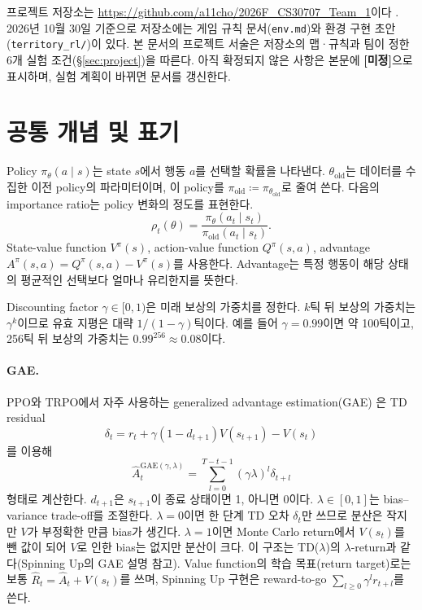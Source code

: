 \documentclass[11pt,a4paper]{article}
\newcommand{\TBD}{\textbf{[미정]}}
\begin{document}
프로젝트 저장소는 \url{https://github.com/a11cho/2026F_CS30707_Team_1}이다 \cite{repo}. 2026년 10월 30일 기준으로 저장소에는 게임 규칙 문서(\texttt{env.md})와 환경 구현 초안(\texttt{territory\_rl/})이 있다. 본 문서의 프로젝트 서술은 저장소의 맵·규칙과 팀이 정한 6개 실험 조건(\S\ref{sec:project})을 따른다. 아직 확정되지 않은 사항은 본문에 \TBD{}으로 표시하며, 실험 계획이 바뀌면 문서를 갱신한다.

\section{공통 개념 및 표기}\label{sec:common}
Policy \(\pi_\theta(a\mid s)\)는 state \(s\)에서 행동 \(a\)를 선택할 확률을 나타낸다. \(\theta_{\mathrm{old}}\)는 데이터를 수집한 이전 policy의 파라미터이며, 이 policy를 \(\pi_{\mathrm{old}}\coloneqq\pi_{\theta_{\mathrm{old}}}\)로 줄여 쓴다. 다음의 importance ratio는 policy 변화의 정도를 표현한다.
\begin{equation}
 \rho_t(\theta)=\frac{\pi_\theta(a_t\mid s_t)}{\pi_{\mathrm{old}}(a_t\mid s_t)}.
\end{equation}
State-value function \(V^\pi(s)\), action-value function \(Q^\pi(s,a)\), advantage \(A^\pi(s,a)=Q^\pi(s,a)-V^\pi(s)\)를 사용한다. Advantage는 특정 행동이 해당 상태의 평균적인 선택보다 얼마나 유리한지를 뜻한다.

Discounting factor \(\gamma\in[0,1)\)은 미래 보상의 가중치를 정한다. \(k\)틱 뒤 보상의 가중치는 \(\gamma^k\)이므로 유효 지평은 대략 \(1/(1-\gamma)\)틱이다. 예를 들어 \(\gamma=0.99\)이면 약 100틱이고, 256틱 뒤 보상의 가중치는 \(0.99^{256}\approx0.08\)이다.

\paragraph{GAE.} PPO와 TRPO에서 자주 사용하는 generalized advantage estimation(GAE) \cite{gae}은 TD residual
\begin{equation}
 \delta_t=r_t+\gamma(1-d_{t+1})V(s_{t+1})-V(s_t)
\end{equation}
를 이용해
\begin{equation}
 \widehat A_t^{\mathrm{GAE}(\gamma,\lambda)}=\sum_{l=0}^{T-t-1}(\gamma\lambda)^l\delta_{t+l}
\end{equation}
형태로 계산한다. \(d_{t+1}\)은 \(s_{t+1}\)이 종료 상태이면 1, 아니면 0이다. \(\lambda\in[0,1]\)는 bias--variance trade-off를 조절한다. \(\lambda=0\)이면 한 단계 TD 오차 \(\delta_t\)만 쓰므로 분산은 작지만 \(V\)가 부정확한 만큼 bias가 생긴다. \(\lambda=1\)이면 Monte Carlo return에서 \(V(s_t)\)를 뺀 값이 되어 \(V\)로 인한 bias는 없지만 분산이 크다. 이 구조는 TD(\(\lambda\))의 \(\lambda\)-return과 같다(Spinning Up의 GAE 설명 참고). Value function의 학습 목표(return target)로는 보통 \(\widehat R_t=\widehat A_t+V(s_t)\)를 쓰며, Spinning Up 구현은 reward-to-go \(\sum_{l\ge0}\gamma^l r_{t+l}\)를 쓴다.
\end{document}
